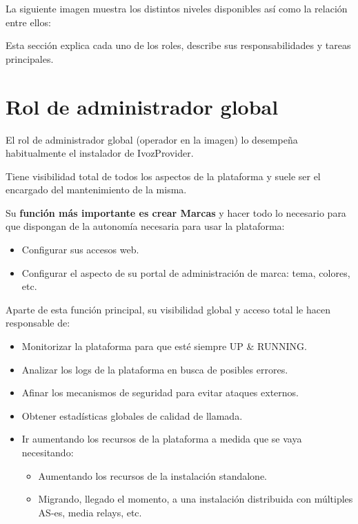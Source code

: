 \documentclass[letterpaper,10pt,spanish]{sphinxmanual}
\begin{document}
La siguiente imagen muestra los distintos niveles disponibles así como la relación entre ellos:

\noindent{}

Esta sección explica cada uno de los roles, describe sus responsabilidades y tareas principales.


\section{Rol de administrador global}
\label{basic_concepts/operation_roles/index:global-administrator-role}
El rol de administrador global (operador en la imagen) lo desempeña habitualmente el instalador de IvozProvider.

Tiene visibilidad total de todos los aspectos de la plataforma y suele ser el encargado del mantenimiento de la misma.

Su \textbf{función más importante es crear Marcas} y hacer todo lo necesario para que dispongan de la autonomía necesaria para usar la plataforma:
\begin{itemize}
\item {} 
Configurar sus accesos web.

\item {} 
Configurar el aspecto de su portal de administración de marca: tema, colores, etc.

\end{itemize}

Aparte de esta función principal, su visibilidad global y acceso total le hacen responsable de:
\begin{itemize}
\item {} 
Monitorizar la plataforma para que esté siempre UP \& RUNNING.

\item {} 
Analizar los logs de la plataforma en busca de posibles errores.

\item {} 
Afinar los mecanismos de seguridad para evitar ataques externos.

\item {} 
Obtener estadísticas globales de calidad de llamada.

\item {} 
Ir aumentando los recursos de la plataforma a medida que se vaya necesitando:
\begin{itemize}
\item {} 
Aumentando los recursos de la instalación standalone.

\item {} 
Migrando, llegado el momento, a una instalación distribuida con múltiples AS-es, media relays, etc.

\end{itemize}

\end{itemize}
\end{document}
